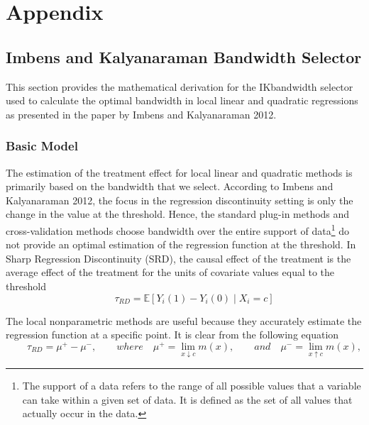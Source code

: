 \documentclass[fleqn]{article}
\begin{document}
    
    
    
    \section{Appendix}
    \label{appendix}

    \subsection{Imbens and Kalyanaraman Bandwidth Selector}
    \label{ikbandwidth}

    This section provides the mathematical derivation for the IKbandwidth selector used to calculate the optimal bandwidth in local linear and quadratic regressions as presented in the paper by Imbens and Kalyanaraman 2012\cite{imbens2012optimal}.

    \subsubsection{Basic Model}

    The estimation of the treatment effect for local linear and quadratic methods is primarily based on the bandwidth that we select. According to Imbens and Kalyanaraman 2012\cite{imbens2012optimal}, the focus in the regression discontinuity setting is only the change in the value at the threshold. Hence, the standard plug-in methods and cross-validation methods choose bandwidth over the entire support of data\footnote{The support of a data refers to the range of all possible values that a variable can take within a given set of data. It is defined as the set of all values that actually occur in the data.} do not provide an optimal estimation of the regression function at the threshold. In Sharp Regression Discontinuity (SRD), the causal effect of the treatment is the average effect of the treatment for the units of covariate values equal to the threshold \\
    \begin{equation*}
        \qquad \tau_{RD} = \mathbb{E} \left[ Y_i(1) - Y_i(0) \middle| X_i = c \right]
    \end{equation*}
    
    The local nonparametric methods are useful because they accurately estimate the regression function at a specific point. It is clear from the following equation\\
    \begin{equation*}
        \qquad \tau_{RD} = \mu^+ - \mu^-, \qquad where \quad\mu^+ = \lim_{x\downarrow c} m(x), \qquad and \quad \mu^- = \lim_{x\uparrow c} m(x), 
    \end{equation*}
\end{document}
